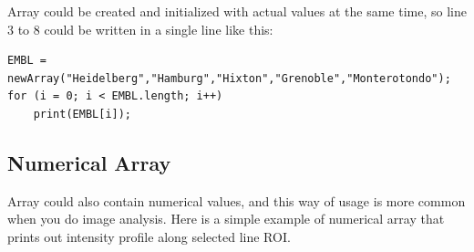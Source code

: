 Array could be created and initialized with actual values at the
same time, so line 3 to 8 could be written in a single line like this: 
\begin{lstlisting}[numbers=none]
EMBL = newArray("Heidelberg","Hamburg","Hixton","Grenoble","Monterotondo");
for (i = 0; i < EMBL.length; i++)
    print(EMBL[i]);
\end{lstlisting}

\subsection{Numerical Array}

Array could also contain numerical values, and this way of usage is more common when you do image analysis. Here is a simple example of numerical array that prints out intensity profile along selected line ROI. 



